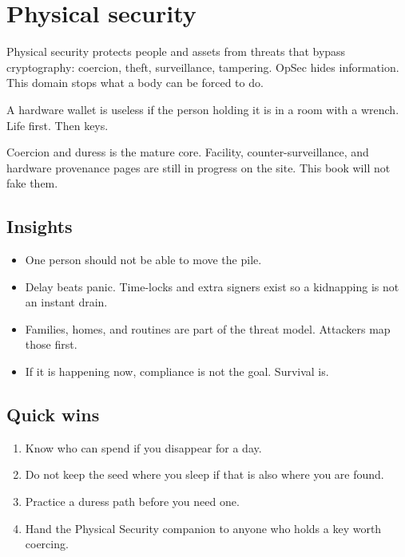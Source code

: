 \chapter{Physical security}

Physical security protects people and assets from threats
that bypass cryptography: coercion, theft, surveillance,
tampering. OpSec hides information. This domain stops
what a body can be forced to do.

A hardware wallet is useless if the person holding it is
in a room with a wrench. Life first. Then keys.

Coercion and duress is the mature core. Facility,
counter-surveillance, and hardware provenance pages are
still in progress on the site. This book will not fake
them.

\section{Insights}

\begin{itemize}
  \item One person should not be able to move the pile.
  \item Delay beats panic. Time-locks and extra signers
  exist so a kidnapping is not an instant drain.
  \item Families, homes, and routines are part of the
  threat model. Attackers map those first.
  \item If it is happening now, compliance is not the
  goal. Survival is.
\end{itemize}

\section{Quick wins}

\begin{enumerate}
  \item Know who can spend if you disappear for a day.
  \item Do not keep the seed where you sleep if that is
  also where you are found.
  \item Practice a duress path before you need one.
  \item Hand the Physical Security companion to anyone
  who holds a key worth coercing.
\end{enumerate}
